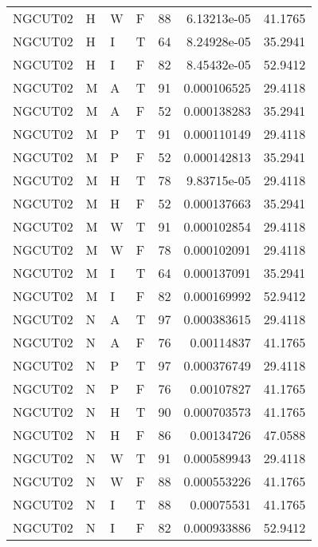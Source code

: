 \begin{table}[htb!]
{\begin{tabular}{llllrrr}
            NGCUT02  & H     & W     & F          & 88         & 6.13213e-05 & 41.1765  \\
            NGCUT02  & H     & I     & T          & 64         & 8.24928e-05 & 35.2941  \\
            NGCUT02  & H     & I     & F          & 82         & 8.45432e-05 & 52.9412  \\
            NGCUT02  & M     & A     & T          & 91         & 0.000106525 & 29.4118  \\
            NGCUT02  & M     & A     & F          & 52         & 0.000138283 & 35.2941  \\
            NGCUT02  & M     & P     & T          & 91         & 0.000110149 & 29.4118  \\
            NGCUT02  & M     & P     & F          & 52         & 0.000142813 & 35.2941  \\
            NGCUT02  & M     & H     & T          & 78         & 9.83715e-05 & 29.4118  \\
            NGCUT02  & M     & H     & F          & 52         & 0.000137663 & 35.2941  \\
            NGCUT02  & M     & W     & T          & 91         & 0.000102854 & 29.4118  \\
            NGCUT02  & M     & W     & F          & 78         & 0.000102091 & 29.4118  \\
            NGCUT02  & M     & I     & T          & 64         & 0.000137091 & 35.2941  \\
            NGCUT02  & M     & I     & F          & 82         & 0.000169992 & 52.9412  \\
            NGCUT02  & N     & A     & T          & 97         & 0.000383615 & 29.4118  \\
            NGCUT02  & N     & A     & F          & 76         & 0.00114837  & 41.1765  \\
            NGCUT02  & N     & P     & T          & 97         & 0.000376749 & 29.4118  \\
            NGCUT02  & N     & P     & F          & 76         & 0.00107827  & 41.1765  \\
            NGCUT02  & N     & H     & T          & 90         & 0.000703573 & 41.1765  \\
            NGCUT02  & N     & H     & F          & 86         & 0.00134726  & 47.0588  \\
            NGCUT02  & N     & W     & T          & 91         & 0.000589943 & 29.4118  \\
            NGCUT02  & N     & W     & F          & 88         & 0.000553226 & 41.1765  \\
            NGCUT02  & N     & I     & T          & 88         & 0.00075531  & 41.1765  \\
            NGCUT02  & N     & I     & F          & 82         & 0.000933886 & 52.9412  \\
            \hline
        \end{tabular}
    }{
    }
\end{table} 
